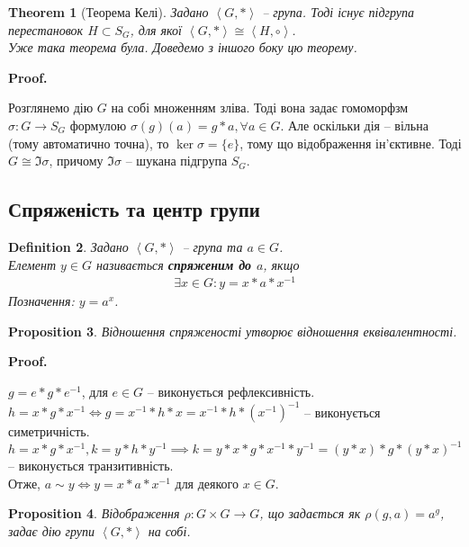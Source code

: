 \documentclass[a4paper, 10pt]{article}
\makeatletter
\theoremstyle{theoremdd}
\newtheorem{theorem}{Theorem}[subsection]
\theoremstyle{theoremdd}
\newtheorem{definition}[theorem]{Definition}
\theoremstyle{theoremdd}
\theoremstyle{theoremdd}
\theoremstyle{theoremdd}
\theoremstyle{theoremdd}
\theoremstyle{theoremdd}
\theoremstyle{theoremdd}
\theoremstyle{theoremdd}
\newtheorem{proposition}[theorem]{Proposition}
\theoremstyle{theoremdd}
\theoremstyle{theoremdd}
\theoremstyle{theoremdd}
\theoremstyle{theoremdd}
\theoremstyle{theoremdd}
\theoremstyle{theoremdd}
\renewenvironment{proof}[1][Proof.\\]{\par
\pushQED{\hfill \qed}%
\normalfont \topsep6\p@\@plus6\p@\relax
\trivlist
\item\relax
{\bfseries
#1\@addpunct{.}}\hspace\labelsep\ignorespaces
}{%
\popQED\endtrivlist\@endpefalse
}
\makeatother
\begin{document}
\begin{theorem}[Теорема Келі]
Задано $\left< G,*\right>$ -- група. Тоді існує підгрупа перестановок $H \subset S_G$, для якої $\left<G,*\right> \cong \left<H,\circ\right>$.\\
\textit{Уже така теорема була. Доведемо з іншого боку цю теорему.}
\end{theorem}

\begin{proof}
Розглянемо дію $G$ на собі множенням зліва. Тоді вона задає гомоморфзм $\sigma \colon G \to S_G$ формулою $\sigma(g)(a) = g*a, \forall a \in G$. Але оскільки дія -- вільна (тому автоматично точна), то $\ker \sigma = \{e\}$, тому що відображення ін'єктивне. Тоді $G \cong \Im \sigma$, причому $\Im \sigma$ -- шукана підгрупа $S_G$.
\end{proof}

\subsection{Спряженість та центр групи}
\begin{definition}
Задано $\left<G,*\right>$ -- група та $a \in G$.\\
Елемент $y \in G$ називається \textbf{спряженим до $a$}, якщо
\begin{align*}
\exists x \in G: y = x*a*x^{-1}
\end{align*}
Позначення: $y = a^x$.
\end{definition}

\begin{proposition}
Відношення спряженості утворює відношення еквівалентності.
\end{proposition}

\begin{proof}
$g = e*g*e^{-1}$, для $e \in G$ -- виконується рефлексивність.\\
$h = x*g*x^{-1} \iff g = x^{-1}*h*x = x^{-1}*h*(x^{-1})^{-1}$ -- виконується симетричність.\\
$h = x*g*x^{-1}, k = y*h*y^{-1} \implies k = y*x*g*x^{-1}*y^{-1} = (y*x)*g*(y*x)^{-1}$ -- виконується транзитивність.\\
Отже, $a \sim y \iff y = x*a*x^{-1}$ для деякого $x \in G$.
\end{proof}

\begin{proposition}
Відображення $\rho \colon G \times G \to G$, що задається як $\rho(g,a) = a^g$, задає дію групи $\left<G,*\right>$ на собі.
\end{proposition}
\end{document}

